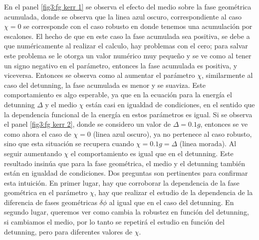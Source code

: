 En el panel \ref{fig3:fg kerr 1} se observa el efecto del medio sobre la fase geométrica acumulada, donde se observa que la linea azul oscuro, correspondiente al caso $\chi=0$ se corresponde con el caso robusto en donde tenemos una acumulación por escalones. El hecho de que en este caso la fase acumulada sea positiva, se debe a que numéricamente al realizar el calculo, hay problemas con el cero; para salvar este problema se le otorga un valor numérico muy pequeño y se ve como al tener un signo negativo en el parámetro, entonces la fase acumulada es positiva, y viceversa. Entonces se observa como al aumentar el parámetro $\chi$, similarmente al caso del detunning, la fase acumulada es menor y se suaviza. Este comportamiento es algo esperable, ya que en la ecuación para la energía el detunning $\Delta$ y el medio $\chi$ están casi en igualdad de condiciones, en el sentido que la dependencia funcional de la energía en estos parámetros es igual.
Si se observa el panel \ref{fig3:fg kerr 2}, donde se considero un valor de $\Delta=0.1g$, entonces se ve como ahora el caso de $\chi=0$ (linea azul oscuro), ya no pertenece al caso robusto, sino que esta situación se recupera cuando $\chi=0.1g=\Delta$ (linea morada). Al seguir aumentando $\chi$ el comportamiento es igual que en el detunning. 
Este resultado insinúa que para la fase geométrica, el medio y el detunning también están en igualdad de condiciones. Dos preguntas son pertinentes para confirmar esta intuición. En primer lugar, hay que corroborar la dependencia de la fase geométrica en el parámetro $\chi$, hay que realizar el estudio de la dependencia de la diferencia de fases geométricas $\delta\phi$ al igual que en el caso del detunning. En segundo lugar, queremos ver como cambia la robustez en función del detunning, si cambiamos el medio, por lo tanto se repetirá el estudio en función del detunning, pero para diferentes valores de $\chi$.
